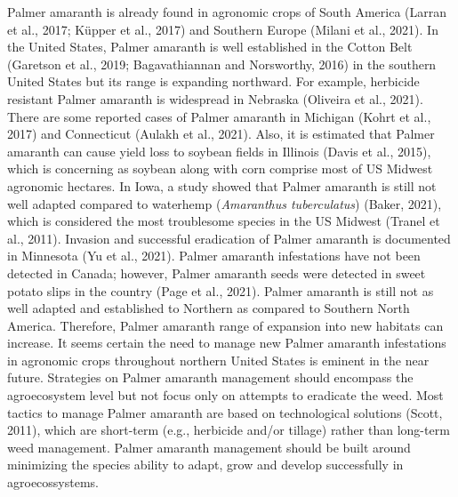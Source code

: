 \documentclass[utf8]{frontiersSCNS}
\begin{document}
Palmer amaranth is already found in agronomic crops of South America
(Larran et al., 2017; Küpper et al., 2017) and Southern Europe (Milani
et al., 2021). In the United States, Palmer amaranth is well established
in the Cotton Belt (Garetson et al., 2019; Bagavathiannan and
Norsworthy, 2016) in the southern United States but its range is
expanding northward. For example, herbicide resistant Palmer amaranth is
widespread in Nebraska (Oliveira et al., 2021). There are some reported
cases of Palmer amaranth in Michigan (Kohrt et al., 2017) and
Connecticut (Aulakh et al., 2021). Also, it is estimated that Palmer
amaranth can cause yield loss to soybean fields in Illinois (Davis et
al., 2015), which is concerning as soybean along with corn comprise most
of US Midwest agronomic hectares. In Iowa, a study showed that Palmer
amaranth is still not well adapted compared to waterhemp
(\emph{Amaranthus tuberculatus}) (Baker, 2021), which is considered the
most troublesome species in the US Midwest (Tranel et al., 2011).
Invasion and successful eradication of Palmer amaranth is documented in
Minnesota (Yu et al., 2021). Palmer amaranth infestations have not been
detected in Canada; however, Palmer amaranth seeds were detected in
sweet potato slips in the country (Page et al., 2021). Palmer amaranth
is still not as well adapted and established to Northern as compared to
Southern North America. Therefore, Palmer amaranth range of expansion
into new habitats can increase. It seems certain the need to manage new
Palmer amaranth infestations in agronomic crops throughout northern
United States is eminent in the near future. Strategies on Palmer
amaranth management should encompass the agroecosystem level but not
focus only on attempts to eradicate the weed. Most tactics to manage
Palmer amaranth are based on technological solutions (Scott, 2011),
which are short-term (e.g., herbicide and/or tillage) rather than
long-term weed management. Palmer amaranth management should be built
around minimizing the species ability to adapt, grow and develop
successfully in agroecossystems.
\end{document}
